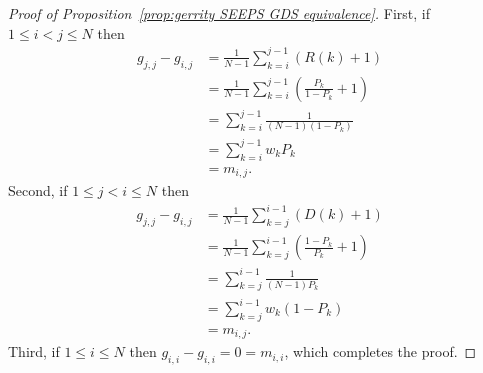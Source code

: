 \documentclass[10pt]{article} %
\theoremstyle{theorem}
\theoremstyle{definition}
\begin{document}
\begin{proof}[Proof of Proposition~\ref{prop:gerrity SEEPS GDS equivalence}]
First, if $1\leq i < j \leq N$ then
\begin{align*}
g_{j,j}-g_{i,j}
&=\frac{1}{N-1}\sum_{k=i}^{j-1}(R(k)+1) \\
&= \frac{1}{N-1}\sum_{k=i}^{j-1}\left(\frac{P_k}{1-P_k}+1\right) \\
&= \sum_{k=i}^{j-1}\frac{1}{(N-1)(1-P_k)} \\
&= \sum_{k=i}^{j-1}w_k P_k \\
&= m_{i,j}.
\end{align*}
Second, if $1\leq j < i \leq N$ then
\begin{align*}
g_{j,j}-g_{i,j}
&=\frac{1}{N-1}\sum_{k=j}^{i-1}(D(k)+1)\\
&= \frac{1}{N-1}\sum_{k=j}^{i-1}\left(\frac{1-P_k}{P_k}+1\right) \\
&= \sum_{k=j}^{i-1} \frac{1}{(N-1)P_k} \\
&= \sum_{k=j}^{i-1} w_k (1-P_k) \\
&= m_{i,j}.
\end{align*}
Third, if $1\leq  i \leq N$ then $g_{i,i}-g_{i,i}=0=m_{i,i}$, which completes the proof.
\end{proof}
\end{document}
